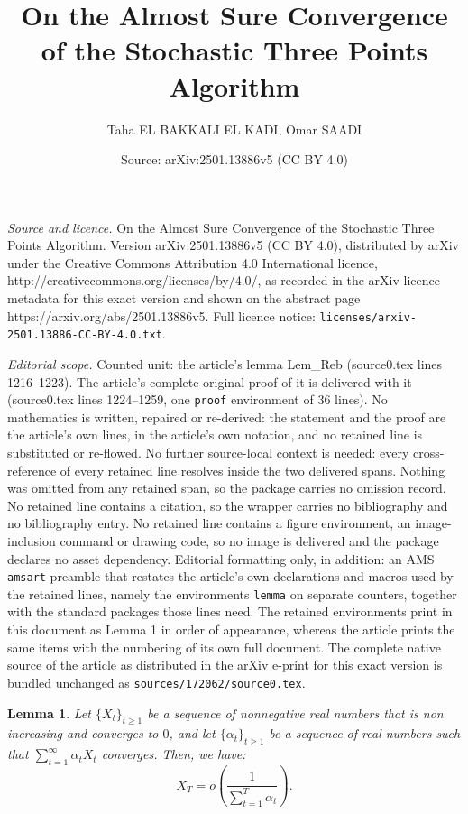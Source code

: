 \documentclass[10pt,a4paper]{amsart}
\title{On the Almost Sure Convergence of the Stochastic Three Points Algorithm}
\author{Taha EL BAKKALI EL KADI, Omar SAADI}
\date{Source: arXiv:2501.13886v5 (CC BY 4.0)}
\newtheorem{lemma}{Lemma}
\begin{document}
\maketitle

\noindent\emph{Source and licence.} On the Almost Sure Convergence of the Stochastic Three Points Algorithm. Version arXiv:2501.13886v5 (CC BY 4.0), distributed by arXiv under the Creative Commons Attribution 4.0 International licence, http://creativecommons.org/licenses/by/4.0/, as recorded in the arXiv licence metadata for this exact version and shown on the abstract page https://arxiv.org/abs/2501.13886v5. Full licence notice: \texttt{licenses/arxiv-2501.13886-CC-BY-4.0.txt}.\par\smallskip

\noindent\textit{Editorial scope.} Counted unit: the article's lemma Lem\_Reb (source0.tex lines 1216--1223). The article's complete original proof of it is delivered with it (source0.tex lines 1224--1259, one \texttt{proof} environment of 36 lines). No mathematics is written, repaired or re-derived: the statement and the proof are the article's own lines, in the article's own notation, and no retained line is substituted or re-flowed.  No further source-local context is needed: every cross-reference of every retained line resolves inside the two delivered spans.  Nothing was omitted from any retained span, so the package carries no omission record.  No retained line contains a citation, so the wrapper carries no bibliography and no bibliography entry.  No retained line contains a figure environment, an image-inclusion command or drawing code, so no image is delivered and the package declares no asset dependency.  Editorial formatting only, in addition: an AMS \texttt{amsart} preamble that restates the article's own declarations and macros used by the retained lines, namely the environments \texttt{lemma} on separate counters, together with the standard packages those lines need.  The retained environments print in this document as Lemma 1 in order of appearance, whereas the article prints the same items with the numbering of its own full document.  The complete native source of the article as distributed in the arXiv e-print for this exact version is bundled unchanged as \texttt{sources/172062/source0.tex}.
\begin{lemma}\label{Lem_Reb} 
 Let \( \{X_t\}_{t \ge 1} \) be a sequence of nonnegative real numbers that is non increasing and converges to \( 0 \), and let \( \{\alpha_t\}_{t \ge 1} \) be a sequence of real numbers such that  \( \sum_{t=1}^{\infty} \alpha_t X_t \) converges. Then, we have:
\[
X_T = o\left( \frac{1}{\sum_{t=1}^T \alpha_t} \right).
\]


\end{lemma}
\end{document}
